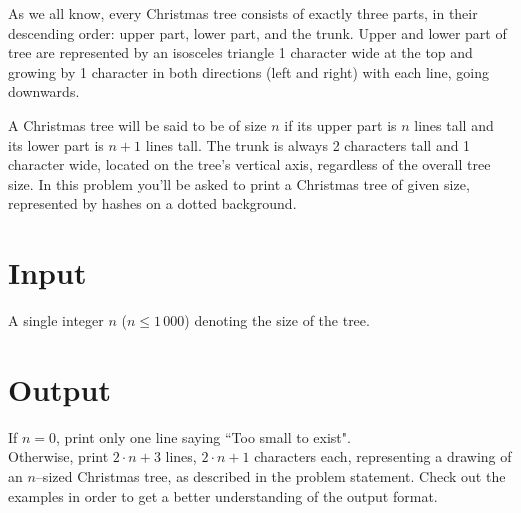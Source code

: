 \documentclass{spiral}
\begin{document}
  \makeheader

  As we all know, every Christmas tree consists of exactly three parts,
  in their descending order: upper part, lower part, and the trunk.
  Upper and lower part of tree are represented by an isosceles triangle 1 character wide
  at the top and growing by 1 character in both directions (left and right) 
  with each line, going downwards.
  
  A Christmas tree will be said to be of size $n$ if its upper part
  is $n$ lines tall and its lower part is $n + 1$ lines tall. 
  The trunk is always 2 characters tall and 1 character wide, located on
  the tree's vertical axis, regardless of the overall tree size.
  In this problem you'll be asked to print a Christmas tree of given size,
  represented by hashes on a dotted background.

  \section{Input}

    A single integer $n$ ($n \leq 1\,000$) denoting the size of the tree.

  \section{Output}

    If $n=0$, print only one line saying ``Too small to exist".\\
    Otherwise, print $2 \cdot n + 3$ lines, $2 \cdot n + 1$ characters each, representing a drawing 
    of an $n$–sized Christmas tree, as described in the problem statement.
    Check out the examples in order to get a better understanding of the output format.

\end{document}
